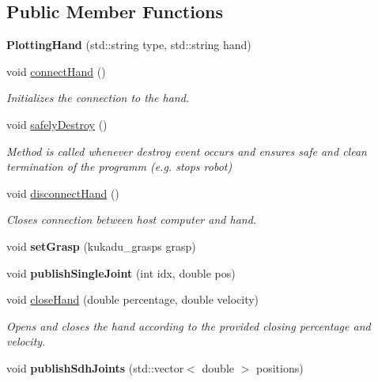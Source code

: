 \subsection*{Public Member Functions}
\begin{DoxyCompactItemize}
\item 
\hypertarget{classkukadu_1_1PlottingHand_a2e52a34555c49eb437f98e5e7a29d4af}{{\bfseries Plotting\-Hand} (std\-::string type, std\-::string hand)}\label{classkukadu_1_1PlottingHand_a2e52a34555c49eb437f98e5e7a29d4af}

\item 
void \hyperlink{classkukadu_1_1PlottingHand_ae1f5f384a2e8db0423b2a2ebe889f4f9}{connect\-Hand} ()
\begin{DoxyCompactList}\small\item\em Initializes the connection to the hand. \end{DoxyCompactList}\item 
void \hyperlink{classkukadu_1_1PlottingHand_aa57430413a6c183592debe8c881c8520}{safely\-Destroy} ()
\begin{DoxyCompactList}\small\item\em Method is called whenever destroy event occurs and ensures safe and clean termination of the programm (e.\-g. stops robot) \end{DoxyCompactList}\item 
void \hyperlink{classkukadu_1_1PlottingHand_a14fc064b6e159b0d7c7a9ce896bfa7d9}{disconnect\-Hand} ()
\begin{DoxyCompactList}\small\item\em Closes connection between host computer and hand. \end{DoxyCompactList}\item 
\hypertarget{classkukadu_1_1PlottingHand_ab87f564a6b136c5ef1036b0307188d94}{void {\bfseries set\-Grasp} (kukadu\-\_\-grasps grasp)}\label{classkukadu_1_1PlottingHand_ab87f564a6b136c5ef1036b0307188d94}

\item 
\hypertarget{classkukadu_1_1PlottingHand_a3885af8e82c367150bdde351a9fa48a4}{void {\bfseries publish\-Single\-Joint} (int idx, double pos)}\label{classkukadu_1_1PlottingHand_a3885af8e82c367150bdde351a9fa48a4}

\item 
void \hyperlink{classkukadu_1_1PlottingHand_adcdc57d192c5dfca6ca154a50a904824}{close\-Hand} (double percentage, double velocity)
\begin{DoxyCompactList}\small\item\em Opens and closes the hand according to the provided closing percentage and velocity. \end{DoxyCompactList}\item 
\hypertarget{classkukadu_1_1PlottingHand_ac89f2cddf2c789e0b36048341a4ca3c1}{void {\bfseries publish\-Sdh\-Joints} (std\-::vector$<$ double $>$ positions)}\label{classkukadu_1_1PlottingHand_ac89f2cddf2c789e0b36048341a4ca3c1}


\end{DoxyCompactItemize}
